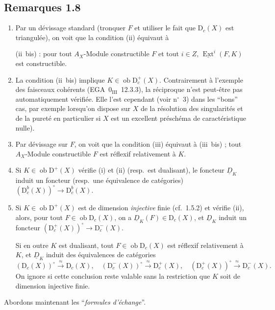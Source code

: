 \documentclass[11pt]{article}
\DeclareMathOperator{\Ext}{Ext}
\newcommand{\D}{\mathrm{D}}
\newcommand{\ob}{\operatorname{ob}}
\providecommand{\ob}{\operatorname{ob}}
\begin{document}
\subsection*{Remarques 1.8}
\begin{enumerate}[label=\alph*)]
\item Par un dévissage standard (tronquer $F$ et utiliser le fait que $\D_c(X)$ est triangulée), on voit que la condition (ii) équivaut à

(ii~bis) : pour tout $A_X$-Module constructible $F$ et tout $i \in Z$, $\underline{\Ext}^i(F,K)$ est constructible.

\item La condition (ii~bis) implique $K \in \ob \D_c^{+}(X)$. Contrairement à l'exemple des faisceaux cohérents (EGA~$0_{\mathrm{III}}$~12.3.3), la réciproque n'est peut-être pas automatiquement vérifiée. Elle l'est cependant (voir n${}^{\circ}$~3) dans les ``bons'' cas, par exemple lorsqu'on dispose sur $X$ de la résolution des singularités et de la
pureté en particulier si $X$ est un excellent préschéma de caractéristique nulle).

\item Par dévissage sur $F$, on voit que la condition (iii) équivaut à (iii~bis) ; tout $A_X$-Module constructible $F$ est réflexif relativement à $K$.

\item Si $K \in \ob \D^{+}(X)$ vérifie (i) et (ii) (resp.~est dualisant), le foncteur $\underline{D}_K$ induit un foncteur (resp.~une équivalence de catégories) $(\D_c^{b}(X))^{\circ} \to \D_c^{b}(X)$.

\item Si $K \in \ob \D^{+}(X)$ est de dimension \emph{injective} finie (cf.~1.5.2) et vérifie (ii), alors, pour tout $F \in \ob \D_c(X)$, on a $\underline{D}_K(F) \in \D_c(X)$, et $\underline{D}_K$ induit un foncteur $(\D_c^{+}(X))^{\circ} \to \D_c^{-}(X)$.

Si en outre $K$ est dualisant, tout $F \in \ob \D_c(X)$ est réflexif relativement à $K$, et $\underline{D}_K$ induit des équivalences de catégories
\[
(\D_c(X))^{\circ} \xrightarrow{\approx} \D_c(X), \quad (\D_c^{-}(X))^{\circ} \xrightarrow{\approx} \D_c^{+}(X), \quad (\D_c^{+}(X))^{\circ} \xrightarrow{\approx} \D_c^{-}(X).
\]
On ignore si cette conclusion reste valable sans la restriction que $K$ soit de dimension injective finie.
\end{enumerate}

Abordons maintenant les ``\emph{formules d'échange}''.
\end{document}
